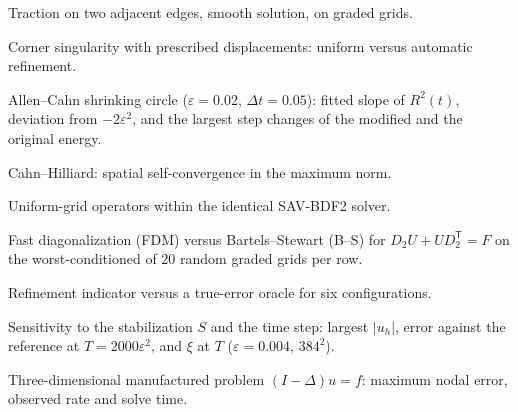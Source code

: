 \documentclass[11pt]{article}
\begin{document}
\clearpage
\begin{table}[htbp]\centering\small
\caption{Traction on two adjacent edges, smooth solution, on graded grids.}

\end{table}

\begin{table}[htbp]\centering\small
\caption{Corner singularity with prescribed displacements: uniform versus automatic refinement.}

\end{table}

\begin{table}[htbp]\centering\small
\caption{Allen--Cahn shrinking circle ($\varepsilon=0.02$, $\Delta t=0.05$): fitted slope of $R^2(t)$, deviation from $-2\varepsilon^2$, and the largest step changes of the modified and the original energy.}

\end{table}

\clearpage
\begin{table}[htbp]\centering\small
\caption{Cahn--Hilliard: spatial self-convergence in the maximum norm.}

\end{table}

\begin{table}[htbp]\centering\small
\caption{Uniform-grid operators within the identical SAV-BDF2 solver.}

\end{table}

\begin{table}[htbp]\centering\small
\caption{Fast diagonalization (FDM) versus Bartels--Stewart (B--S) for $D_2U+UD_2^{\mathsf T}=F$ on the worst-conditioned of 20 random graded grids per row.}

\end{table}

\clearpage
\begin{table}[htbp]\centering\small
\caption{Refinement indicator versus a true-error oracle for six configurations.}

\end{table}

\begin{table}[htbp]\centering\small
\caption{Sensitivity to the stabilization $S$ and the time step: largest $|u_h|$, error against the reference at $T=2000\varepsilon^2$, and $\xi$ at $T$ ($\varepsilon=0.004$, $384^2$).}

\end{table}

\begin{table}[htbp]\centering\small
\caption{Three-dimensional manufactured problem $(I-\Delta)u=f$: maximum nodal error, observed rate and solve time.}

\end{table}
\end{document}
